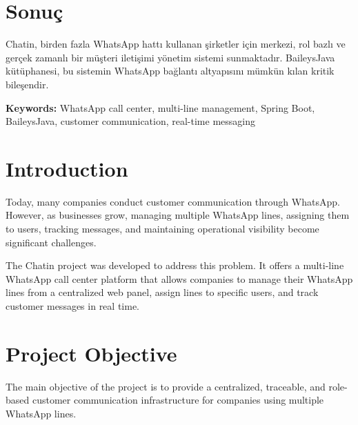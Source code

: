 \documentclass[12pt,a4paper]{article}
\begin{document}
\section{Sonuç}

Chatin, birden fazla WhatsApp hattı kullanan şirketler için merkezi, rol bazlı ve gerçek zamanlı bir müşteri iletişimi yönetim sistemi sunmaktadır. BaileysJava kütüphanesi, bu sistemin WhatsApp bağlantı altyapısını mümkün kılan kritik bileşendir.

\newpage
\setcounter{section}{0}

\begin{abstract}
This report analyzes Chatin, a multi-line WhatsApp call center and customer communication management platform. The project is designed for companies that operate multiple WhatsApp lines and need a centralized system to assign those lines to users, monitor conversations, and manage customer interactions in real time. The backend system, ChatinJava, uses a custom Java library named BaileysJava to handle WhatsApp connectivity.
\end{abstract}

\textbf{Keywords:} WhatsApp call center, multi-line management, Spring Boot, BaileysJava, customer communication, real-time messaging

\section{Introduction}

Today, many companies conduct customer communication through WhatsApp. However, as businesses grow, managing multiple WhatsApp lines, assigning them to users, tracking messages, and maintaining operational visibility become significant challenges.

The Chatin project was developed to address this problem. It offers a multi-line WhatsApp call center platform that allows companies to manage their WhatsApp lines from a centralized web panel, assign lines to specific users, and track customer messages in real time.

\section{Project Objective}

The main objective of the project is to provide a centralized, traceable, and role-based customer communication infrastructure for companies using multiple WhatsApp lines.
\end{document}
